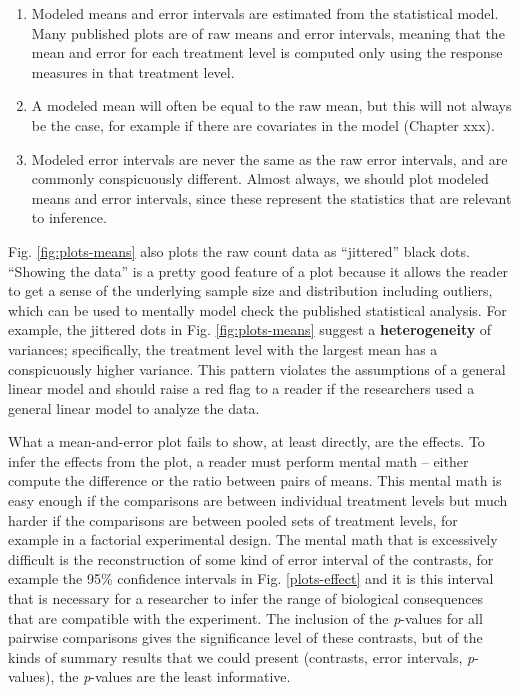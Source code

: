 \documentclass[]{book}
\providecommand{\tightlist}{%
  \setlength{\itemsep}{0pt}\setlength{\parskip}{0pt}}
\begin{document}
\begin{enumerate}
\def\labelenumi{\arabic{enumi}.}
\tightlist
\item
  Modeled means and error intervals are estimated from the statistical model. Many published plots are of raw means and error intervals, meaning that the mean and error for each treatment level is computed only using the response measures in that treatment level.
\item
  A modeled mean will often be equal to the raw mean, but this will not always be the case, for example if there are covariates in the model (Chapter xxx).
\item
  Modeled error intervals are never the same as the raw error intervals, and are commonly conspicuously different. Almost always, we should plot modeled means and error intervals, since these represent the statistics that are relevant to inference.
\end{enumerate}

Fig. \ref{fig:plots-means} also plots the raw count data as ``jittered'' black dots. ``Showing the data'' is a pretty good feature of a plot because it allows the reader to get a sense of the underlying sample size and distribution including outliers, which can be used to mentally model check the published statistical analysis. For example, the jittered dots in Fig. \ref{fig:plots-means} suggest a \textbf{heterogeneity} of variances; specifically, the treatment level with the largest mean has a conspicuously higher variance. This pattern violates the assumptions of a general linear model and should raise a red flag to a reader if the researchers used a general linear model to analyze the data.

What a mean-and-error plot fails to show, at least directly, are the effects. To infer the effects from the plot, a reader must perform mental math -- either compute the difference or the ratio between pairs of means. This mental math is easy enough if the comparisons are between individual treatment levels but much harder if the comparisons are between pooled sets of treatment levels, for example in a factorial experimental design. The mental math that is excessively difficult is the reconstruction of some kind of error interval of the contrasts, for example the 95\% confidence intervals in Fig. \ref{plots-effect} and it is this interval that is necessary for a researcher to infer the range of biological consequences that are compatible with the experiment. The inclusion of the \emph{p}-values for all pairwise comparisons gives the significance level of these contrasts, but of the kinds of summary results that we could present (contrasts, error intervals, \emph{p}-values), the \emph{p}-values are the least informative.
\end{document}
